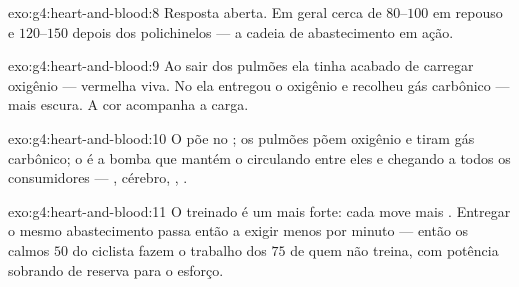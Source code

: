 \begin{solution}{exo:g4:heart-and-blood:8}
Resposta aberta. Em geral cerca de $80$--$100$ em repouso e
$120$--$150$ depois dos polichinelos --- a cadeia de abastecimento em
ação.
\end{solution}

\begin{solution}{exo:g4:heart-and-blood:9}
Ao sair dos pulmões ela tinha acabado de carregar oxigênio ---
vermelha viva. No  ela entregou o oxigênio e recolheu gás
carbônico --- mais escura. A cor acompanha a carga.
\end{solution}

\begin{solution}{exo:g4:heart-and-blood:10}
O  põe  no ; os pulmões põem
oxigênio e tiram gás carbônico; o  é a bomba que mantém o
 circulando entre eles e chegando a todos os consumidores ---
, cérebro, , .
\end{solution}

\begin{solution}{exo:g4:heart-and-blood:11}
O  treinado é um  mais forte: cada  move mais
. Entregar o mesmo abastecimento passa então a exigir menos
 por minuto --- então os calmos $50$ do ciclista fazem o
trabalho dos $75$ de quem não treina, com potência sobrando de
reserva para o esforço.
\end{solution}
